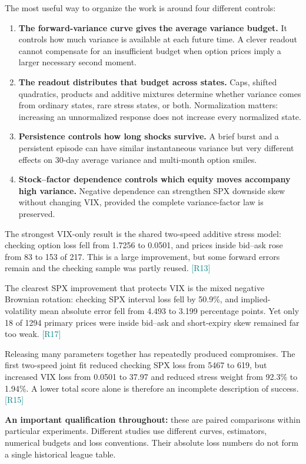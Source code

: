 \documentclass[11pt,a4paper]{article}
\newcommand{\src}[1]{\textcolor{teal}{\small[#1]}}
\begin{document}
The most useful way to organize the work is around four different controls:
\begin{enumerate}
\item \textbf{The forward-variance curve gives the average variance budget.} It controls how much variance is available at each future time. A clever readout cannot compensate for an insufficient budget when option prices imply a larger necessary second moment.
\item \textbf{The readout distributes that budget across states.} Caps, shifted quadratics, products and additive mixtures determine whether variance comes from ordinary states, rare stress states, or both. Normalization matters: increasing an unnormalized response does not increase every normalized state.
\item \textbf{Persistence controls how long shocks survive.} A brief burst and a persistent episode can have similar instantaneous variance but very different effects on 30-day average variance and multi-month option smiles.
\item \textbf{Stock--factor dependence controls which equity moves accompany high variance.} Negative dependence can strengthen SPX downside skew without changing VIX, provided the complete variance-factor law is preserved.
\end{enumerate}

The strongest VIX-only result is the shared two-speed additive stress model: checking option loss fell from 1.7256 to 0.0501, and prices inside bid--ask rose from 83 to 153 of 217. This is a large improvement, but some forward errors remain and the checking sample was partly reused. \src{R13}

The clearest SPX improvement that protects VIX is the mixed negative Brownian rotation: checking SPX interval loss fell by 50.9\%, and implied-volatility mean absolute error fell from 4.493 to 3.199 percentage points. Yet only 18 of 1294 primary prices were inside bid--ask and short-expiry skew remained far too weak. \src{R17}

Releasing many parameters together has repeatedly produced compromises. The first two-speed joint fit reduced checking SPX loss from 5467 to 619, but increased VIX loss from 0.0501 to 37.97 and reduced stress weight from 92.3\% to 1.94\%. A lower total score alone is therefore an incomplete description of success. \src{R15}

\textbf{An important qualification throughout:} these are paired comparisons within particular experiments. Different studies use different curves, estimators, numerical budgets and loss conventions. Their absolute loss numbers do not form a single historical league table.
\end{document}
